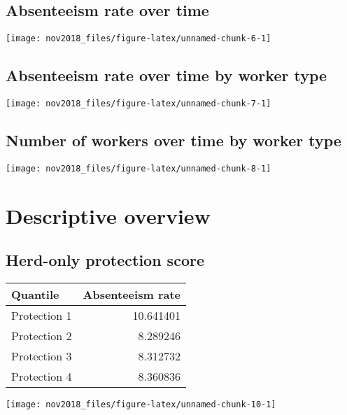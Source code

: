 \documentclass[]{article}
\begin{document}
\subsection{Absenteeism rate over
time}\label{absenteeism-rate-over-time}

\begin{center}\texttt{[image: nov2018\_files/figure-latex/unnamed-chunk-6-1]} \end{center}

\subsection{Absenteeism rate over time by worker
type}\label{absenteeism-rate-over-time-by-worker-type}

\begin{center}\texttt{[image: nov2018\_files/figure-latex/unnamed-chunk-7-1]} \end{center}

\subsection{Number of workers over time by worker
type}\label{number-of-workers-over-time-by-worker-type}

\begin{center}\texttt{[image: nov2018\_files/figure-latex/unnamed-chunk-8-1]} \end{center}

\section{Descriptive overview}\label{descriptive-overview}

\subsection{Herd-only protection
score}\label{herd-only-protection-score}

\begin{tabular}{l|r}
\hline
Quantile & Absenteeism rate\\
\hline
Protection 1 & 10.641401\\
\hline
Protection 2 & 8.289246\\
\hline
Protection 3 & 8.312732\\
\hline
Protection 4 & 8.360836\\
\hline
\end{tabular}

\begin{center}\texttt{[image: nov2018\_files/figure-latex/unnamed-chunk-10-1]} \end{center}
\end{document}
